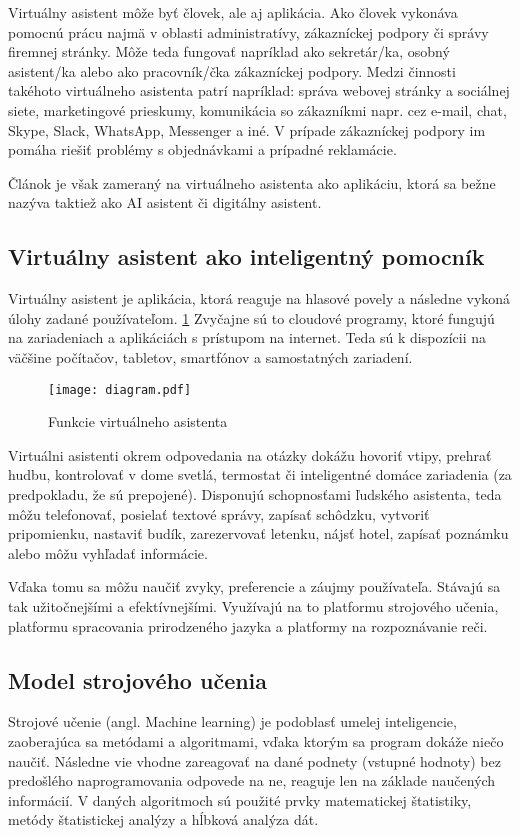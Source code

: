 \documentclass[10pt,twoside,slovak,coursepaper]{article}
\begin{document}
Virtuálny asistent môže byť človek, ale aj aplikácia. Ako človek vykonáva pomocnú prácu najmä v oblasti administratívy, zákazníckej podpory či správy firemnej stránky. Môže teda fungovať napríklad ako sekretár/ka, osobný asistent/ka alebo ako pracovník/čka zákazníckej podpory. Medzi činnosti takéhoto virtuálneho asistenta patrí napríklad: správa webovej stránky a sociálnej siete, marketingové prieskumy, komunikácia so zákazníkmi napr. cez e-mail, chat, Skype, Slack, WhatsApp, Messenger a iné. V prípade zákazníckej podpory im pomáha riešiť problémy s objednávkami a prípadné reklamácie.\cite{Bouhanikova}

Článok je však zameraný na virtuálneho asistenta ako aplikáciu, ktorá sa bežne nazýva taktiež ako AI asistent či digitálny asistent. 

\subsection{Virtuálny asistent ako inteligentný pomocník}
Virtuálny asistent je aplikácia, ktorá reaguje na hlasové povely a následne vykoná úlohy zadané používateľom. \ref{diagram} Zvyčajne sú to cloudové programy, ktoré fungujú na zariadeniach a aplikáciách s prístupom na internet. Teda sú k dispozícii na väčšine počítačov, tabletov, smartfónov a samostatných zariadení.\cite{Gupta}
\begin{figure}[H]
\centering
\texttt{[image: diagram.pdf]}
\caption{Funkcie virtuálneho asistenta \cite{McLaughlin}}
\label{diagram}
\end{figure}

Virtuálni asistenti okrem odpovedania na otázky dokážu hovoriť vtipy, prehrať hudbu, kontrolovať v dome svetlá, termostat či inteligentné domáce zariadenia (za predpokladu, že sú prepojené). Disponujú schopnosťami ľudského asistenta, teda môžu telefonovať, posielať textové správy, zapísať schôdzku, vytvoriť pripomienku, nastaviť budík, zarezervovať letenku, nájsť hotel, zapísať poznámku alebo môžu vyhľadať informácie. \cite{McLaughlin}

Vďaka tomu sa môžu naučiť zvyky, preferencie a záujmy používateľa. Stávajú sa tak užitočnejšími a efektívnejšími. Využívajú na to platformu strojového učenia, platformu spracovania prirodzeného jazyka a platformy na rozpoznávanie reči.\cite{Botelho}

\subsection{Model strojového učenia}
Strojové učenie (angl. Machine learning) je podoblasť umelej inteligencie, zaoberajúca sa metódami a algoritmami, vďaka ktorým sa program dokáže niečo naučiť. Následne vie vhodne zareagovať na dané podnety (vstupné hodnoty) bez predošlého naprogramovania odpovede na ne, reaguje len na základe naučených informácií. V daných algoritmoch sú použité prvky matematickej štatistiky, metódy štatistickej analýzy a hĺbková analýza dát. \cite{Cibula}
\end{document}
